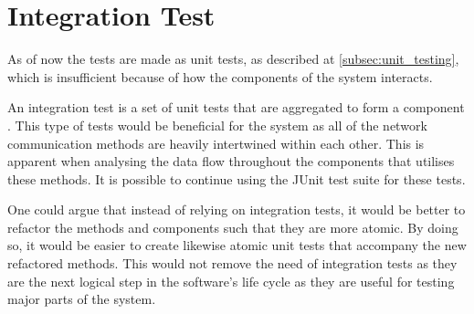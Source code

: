 \section{Integration Test}\label{int_testing}
As of now the tests are made as unit tests, as described at \cref{subsec:unit_testing}, which is insufficient because of how the components of the system interacts.

An integration test is a set of unit tests that are aggregated to form a component \cite{msdn_it}. This type of tests would be beneficial for the system as all of the network communication methods are heavily intertwined within each other. This is apparent when analysing the data flow throughout the components that utilises these methods. It is possible to continue using the JUnit test suite for these tests.

One could argue that instead of relying on integration tests, it would be better to refactor the methods and components such that they are more atomic. By doing so, it would be easier to create likewise atomic unit tests that accompany the new refactored methods. This would not remove the need of integration tests as they are the next logical step in the software's life cycle as they are useful for testing major parts of the system. 


